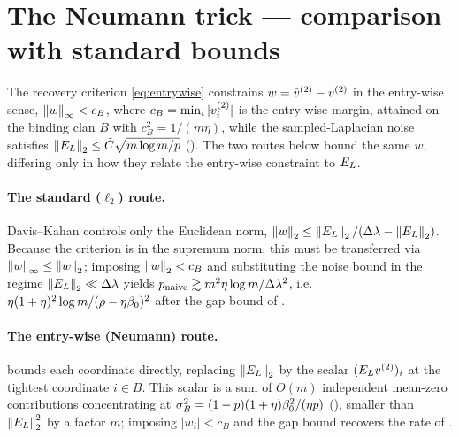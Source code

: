 %
\section{The Neumann trick --- comparison with standard bounds}\label{app:compare}

The recovery criterion \eqref{eq:entrywise} constrains $w=\hat v^{(2)}-v^{(2)}$ in the
entry-wise sense, $\left\lVert w \right\rVert_\infty<c_B$, where $c_B=\min_i|v^{(2)}_i|$ is the
entry-wise margin, attained on the binding clan $B$ with $c_B^2=1/(m\eta)$, while
the sampled-Laplacian noise satisfies $\left\lVert E_{L} \right\rVert_{2}\le\tilde C\sqrt{m\log
m/p}$ (). The two routes below bound the same $w$, differing
only in how they relate the entry-wise constraint to $E_{L}$.

\paragraph{The standard ($\ell_2$) route.} Davis--Kahan controls only the Euclidean
norm, $\left\lVert w \right\rVert_2\le\left\lVert E_{L} \right\rVert_{2}/(\Delta\lambda-\left\lVert E_{L} \right\rVert_{2})$. Because the criterion is in
the supremum norm, this must be transferred via $\left\lVert w \right\rVert_\infty\le\left\lVert w \right\rVert_2$;
imposing $\left\lVert w \right\rVert_2<c_B$ and substituting the noise bound in the regime
$\left\lVert E_{L} \right\rVert_{2}\ll\Delta\lambda$ yields $p_{\mathrm{naive}}\gtrsim m^2\eta\log m/\Delta\lambda^2$,
i.e.\ $\eta(1+\eta)^2\log m/(\rho-\eta\beta_0)^2$ after the gap bound of .

\paragraph{The entry-wise (Neumann) route.}  bounds each
coordinate directly, replacing $\left\lVert E_{L} \right\rVert_{2}$ by the scalar $(E_{L}v^{(2)})_i$ at the
tightest coordinate $i\in B$. This scalar is a sum of $O(m)$ independent mean-zero
contributions concentrating at $\sigma_B^2=(1-p)(1+\eta)\beta_0^2/(\eta p)$
(), smaller than $\left\lVert E_{L} \right\rVert_{2}^2$ by a factor $m$; imposing
$|w_i|<c_B$ and the gap bound recovers the rate of .

